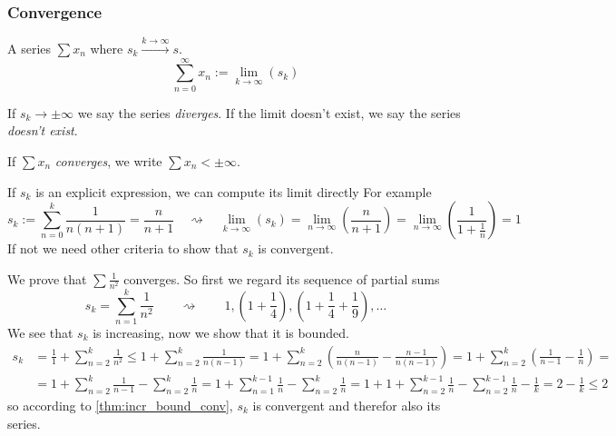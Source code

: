 \subsubsection{Convergence}
\begin{definition}\label{def:series_convergence}
   A series \(\sum x_n\) where \(s_k \xrightarrow{k \to \infty} s\).
   \[\sum_{n=0}^{\infty} x_n := \lim_{k \to \infty}(s_k)\]
\end{definition}
\begin{remark}[Terminology]
   If \(s_k \to \pm\infty\) we say the series \emph{diverges}.
   If the limit doesn't exist, we say the series \emph{doesn't exist}.
\end{remark}
\begin{remark}[Notation]
   If \(\sum x_n\) \emph{converges}, we write \(\sum x_n < \pm\infty\).
\end{remark}
If \(s_k\) is an explicit expression, we can compute its limit directly
For example
\[s_k := \sum_{n=0}^k \frac{1}{n(n+1)} = \frac{n}{n+1} \quad\rightsquigarrow\quad \lim_{k \to \infty}(s_k) = \lim_{n \to \infty}\left(\frac{n}{n+1}\right) = \lim_{n \to \infty}\left(\frac{1}{1+\frac{1}{n}}\right) = 1\]
If not we need other criteria to show that \(s_k\) is convergent.
\begin{example}
   We prove that \(\sum \frac{1}{n^2}\) converges.
   So first we regard its sequence of partial sums
   \[s_k = \sum_{n=1}^k \frac{1}{n^2} \qquad\rightsquigarrow\qquad 1, \left(1 + \frac{1}{4}\right),  \left(1 + \frac{1}{4} + \frac{1}{9}\right), \ldots\]
   We see that \(s_k\) is increasing, now we show that it is bounded.
   \begin{equation*}
      \begin{split}
         s_k & = \frac{1}{1} + \sum_{n=2}^k \frac{1}{n^2} \leq 1 + \sum_{n=2}^k \frac{1}{n(n-1)} = 1 + \sum_{n=2}^k \left(\frac{n}{n(n-1)} - \frac{n-1}{n(n-1)}\right) = 1 + \sum_{n=2}^k \left(\frac{1}{n-1} - \frac{1}{n}\right) = \\
             & = 1 + \sum_{n=2}^k \frac{1}{n-1} - \sum_{n=2}^k \frac{1}{n} = 1 + \sum_{n=1}^{k-1} \frac{1}{n} - \sum_{n=2}^k \frac{1}{n} = 1 + 1 + \sum_{n=2}^{k-1} \frac{1}{n} - \sum_{n=2}^{k-1}\frac{1}{n} - \frac{1}{k} = 2 - \frac{1}{k} \leq 2
      \end{split}
   \end{equation*}
   so according to \cref{thm:incr_bound_conv}, \(s_k\) is convergent and therefor also its series.
\end{example}

